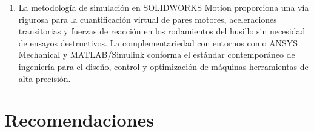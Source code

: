 \documentclass[12pt,a4paper]{article}
\begin{document}
\begin{enumerate}[itemsep=4pt, topsep=3pt, parsep=0pt]
    \item La metodología de simulación en SOLIDWORKS Motion proporciona una vía rigurosa para la cuantificación virtual de pares motores, aceleraciones transitorias y fuerzas de reacción en los rodamientos del husillo sin necesidad de ensayos destructivos. La complementariedad con entornos como ANSYS Mechanical y MATLAB/Simulink conforma el estándar contemporáneo de ingeniería para el diseño, control y optimización de máquinas herramientas de alta precisión.
\end{enumerate}

\vspace{4pt}
\noindent{\color{utablue!30}\rule{\textwidth}{0.5pt}}
\vspace{2pt}
\section{Recomendaciones}
\label{sec:recomendaciones}
\end{document}
